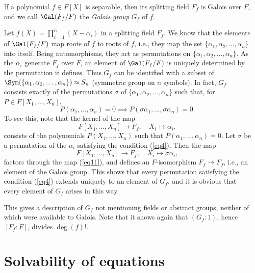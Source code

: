 \documentclass[a4paper,11pt,final,openany]{memoir}
\theoremstyle{nonumberplain}
\begin{document}
\label{ggp}

If a polynomial $f\in F[X]$ is separable, then its splitting field $F_{f}$ is
Galois over $F$, and we call $\Gal(F_{f}/F)$ the \emph{Galois group}%
$G_{f}$ of $f.$

Let $f(X)=\prod_{i=1}^{n}(X-\alpha_{i})$ in a splitting field $F_{f}$. We know
that the elements of $\Gal(F_{f}/F)$ map roots of $f$ to roots of $f$, i.e.,
they map the set $\{\alpha_{1},\alpha_{2},\ldots,\alpha_{n}\}$ into itself.
Being automorphisms, they act as permutations on $\{\alpha_{1},\alpha
_{2},\ldots,\alpha_{n}\}$. As the $\alpha_{i}$ generate $F_{f}$ over $F$, an
element of $\Gal(F_{f}/F)$ is uniquely determined by the permutation it
defines. Thus $G_{f}$ can be identified with a subset of $\Sym(\{\alpha
_{1},\alpha_{2},\ldots,\alpha_{n}\})\approx S_{n}$
%
(symmetric group on $n$ symbols). In fact, $G_{f}$ consists exactly of the
permutations $\sigma$ of $\{\alpha_{1},\alpha_{2},\ldots,\alpha_{n}\}$ such
that, for $P\in F[X_{1},\ldots,X_{n}]$,%
\begin{equation}
P(\alpha_{1},\ldots,\alpha_{n})=0\implies P(\sigma\alpha_{1},\ldots
,\sigma\alpha_{n})=0. \label{eq4}%
\end{equation}
To see this, note that the kernel of the map%
\begin{equation}
F[X_{1},\ldots,X_{n}]\rightarrow F_{f},\quad X_{i}\mapsto\alpha_{i},
\label{eq11}%
\end{equation}
consists of the polynomials $P(X_{1},\ldots,X_{n})$ such that $P(\alpha
_{1},\ldots,\alpha_{n})=0$. Let $\sigma$ be a permutation of the $\alpha_{i}$
satisfying the condition (\ref{eq4}). Then the map%
\[
F[X_{1},\ldots,X_{n}]\rightarrow F_{f},\quad X_{i}\mapsto\sigma\alpha_{i},
\]
factors through the map (\ref{eq11}), and defines an $F$-isomorphism
$F_{f}\rightarrow F_{f}$, i.e., an element of the Galois group. This shows
that every permutation satisfying the condition (\ref{eq4}) extends uniquely
to an element of $G_{f}$, and it is obvious that every element of $G_{f}$
arises in this way.

This gives a description of $G_{f}$ not mentioning fields or abstract groups,
neither of which were available to Galois. Note that it shows again that
$(G_{f}\colon1)$, hence $[F_{f}\colon F]$, divides $\deg(f)!.$

\section{Solvability of equations}
\end{document}
